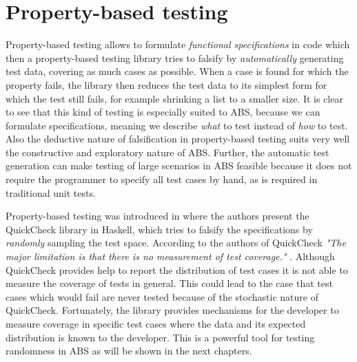 \section*{Property-based testing}
\label{sec:proptesting}
Property-based testing allows to formulate \textit{functional specifications} in code which then a property-based testing library tries to falsify by \textit{automatically} generating test data, covering as much cases as possible. When a case is found for which the property fails, the library then reduces the test data to its simplest form for which the test still fails, for example shrinking a list to a smaller size. It is clear to see that this kind of testing is especially suited to ABS, because we can formulate specifications, meaning we describe \textit{what} to test instead of \textit{how} to test. Also the deductive nature of falsification in property-based testing suits very well the constructive and exploratory nature of ABS. Further, the automatic test generation can make testing of large scenarios in ABS feasible because it does not require the programmer to specify all test cases by hand, as is required in traditional unit tests.

Property-based testing was introduced in \cite{claessen_quickcheck_2000,claessen_testing_2002} where the authors present the QuickCheck library in Haskell, which tries to falsify the specifications by \textit{randomly} sampling the test space. %
According to the authors of QuickCheck \textit{"The major limitation is that there is no measurement of test coverage."} \cite{claessen_quickcheck_2000}. Although QuickCheck provides help to report the distribution of test cases it is not able to measure the coverage of tests in general. This could lead to the case that test cases which would fail are never tested because of the stochastic nature of QuickCheck. Fortunately, the library provides mechanisms for the developer to measure coverage in specific test cases where the data and its expected distribution is known to the developer. This is a powerful tool for testing randomness in ABS as will be shown in the next chapters.

